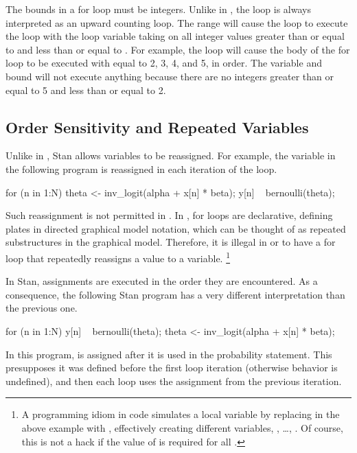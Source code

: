The bounds in a for loop must be integers.  Unlike in \R, the loop is
always interpreted as an upward counting loop.  The range 
will cause the loop to execute the loop with the loop variable taking
on all integer values greater than or equal to  and less than
or equal to .  For example, the loop 
will cause the body of the for loop to be executed with  equal
to 2, 3, 4, and 5, in order.  The variable and bound  will not execute anything because there are no integers
greater than or equal to 5 and less than or equal to 2.

\subsection{Order Sensitivity and Repeated Variables}

Unlike in \BUGS, Stan allows variables to be reassigned.  For
example, the variable  in the following program is
reassigned in each iteration of the loop.
%
\begin{stancode}
for (n in 1:N) {
  theta <- inv_logit(alpha + x[n] * beta);
  y[n] ~ bernoulli(theta);
}
\end{stancode}
%
Such reassignment is not permitted in \BUGS.  In \BUGS, for loops are
declarative, defining plates in directed graphical model notation,
which can be thought of as repeated substructures in the graphical
model.  Therefore, it is illegal in \BUGS or \JAGS to have a for loop
that repeatedly reassigns a value to a variable.%
%
\footnote{A programming idiom in \BUGS code simulates
a local variable by replacing  in the above example with
, effectively creating  different variables,
, \ldots, .  Of course, this is not a
hack if the value of  is required for all .}

In Stan, assignments are executed in the order they are encountered.
As a consequence, the following Stan program has a very different
interpretation than the previous one.
%
\begin{stancode}
for (n in 1:N) {
  y[n] ~ bernoulli(theta);
  theta <- inv_logit(alpha + x[n] * beta);
}
\end{stancode}
%
In this program,  is assigned after it is used in the
probability statement.  This presupposes it was defined before the
first loop iteration (otherwise behavior is undefined), and then each
loop uses the assignment from the previous iteration.

